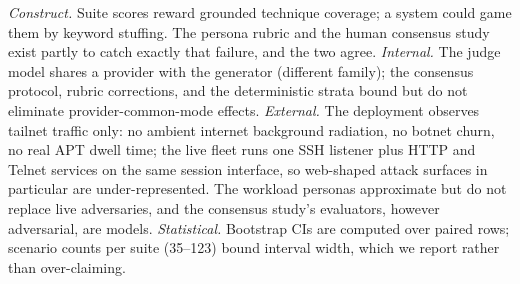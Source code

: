 \emph{Construct.} Suite scores reward grounded technique coverage; a
system could game them by keyword stuffing. The persona rubric and the
human consensus study exist partly to catch exactly that failure, and
the two agree. \emph{Internal.} The judge model shares a provider with
the generator (different family); the consensus protocol, rubric
corrections, and the deterministic strata bound but do not eliminate
provider-common-mode effects. \emph{External.} The deployment observes tailnet traffic only: no ambient internet background
radiation, no botnet churn, no real APT dwell time; the live fleet runs
one SSH listener plus HTTP and Telnet services on the same session
interface, so web-shaped attack surfaces in particular are
under-represented. The workload personas approximate
but do not replace live adversaries, and the consensus study's
evaluators, however adversarial, are models. \emph{Statistical.}
Bootstrap CIs are computed over paired rows; scenario counts per suite
(35--123) bound interval width, which we report rather than
over-claiming.
